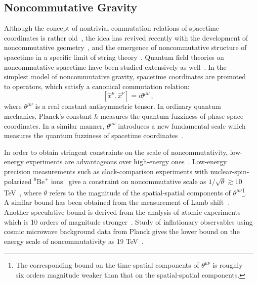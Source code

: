 \documentclass[prd,twocolumn,nofootinbib]{revtex4-1}
\newcommand\be{\begin{equation}}
\newcommand\ee{\end{equation}}
\begin{document}
 \subsection{Noncommutative Gravity}
Although the concept of nontrivial commutation relations of spacetime coordinates is rather old~\cite{Snyder:1946qz,Snyder:1947nq}, the idea has revived recently with the development of noncommutative geometry~\cite{connes1985non,connes1995noncommutative,1987117,Landi:1997sh,Woronowicz:1987vs}, and the emergence of noncommutative structure of spacetime in a specific limit of string theory~\cite{WITTEN1986253,Seiberg:1999vs}. Quantum field theories on noncommutative spacetime have been studied extensively as well~\cite{Douglas:2001ba,Rivelles:2002ez,Szabo:2001kg}. In the simplest model of  noncommutative gravity, spacetime coordinates are promoted to operators, which satisfy a canonical commutation relation:
\be
\left[\hat{x}^{\mu},\hat{x}^{\nu}\right]=i \theta^{\mu\nu}\,,
\ee
where $\theta^{\mu\nu}$ is a real constant antisymmetric tensor. In ordinary quantum mechanics, Planck's constant $\hbar$ measures the quantum fuzziness of phase space coordinates. In a similar manner, $\theta^{\mu\nu}$ introduces a new fundamental scale which measures the quantum fuzziness of spacetime coordinates~\cite{Kobakhidze:2016cqh}.



In order to obtain stringent constraints on the scale of noncommutativity, low-energy experiments are advantageous over high-energy ones~\cite{Carroll:2001ws,Mocioiu:2000ip}. Low-energy precision measurements such as clock-comparison experiments with nuclear-spin-polarized $_{}^{9}\textrm{Be}^+$ ions~\cite{PhysRevLett.54.2387} give a constraint on noncommutative scale as $1/\sqrt{\theta}\gtrsim 10$ TeV~\cite{Carroll:2001ws}, where $\theta$ refers to the magnitude of the spatial-spatial components of $\theta^{\mu\nu}$\footnote{The corresponding bound on the time-spatial components of $\theta^{\mu\nu}$ is roughly six orders magnitude weaker than that on the spatial-spatial components.}. A similar bound has been obtained from the measurement of Lamb shift~\cite{PhysRevLett.86.2716}. Another speculative bound is derived from the analysis of atomic experiments which is 10 orders of magnitude stronger~\cite{Berglund:1995zz,Mocioiu:2000ip}. Study of inflationary observables using cosmic microwave background data from Planck gives the lower bound on the energy scale of noncommutativity as  19 TeV~\cite{calmet2015inflation,PhysRevD.91.083503}.
\end{document}
